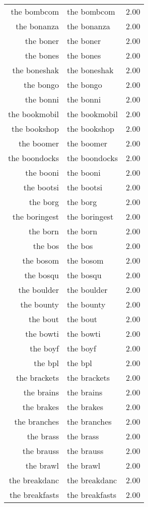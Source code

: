 \begin{table}[ht]
\begin{tabular}{rlr}
  the bombcom & the bombcom & 2.00 \\ 
  the bonanza & the bonanza & 2.00 \\ 
  the boner & the boner & 2.00 \\ 
  the bones & the bones & 2.00 \\ 
  the boneshak & the boneshak & 2.00 \\ 
  the bongo & the bongo & 2.00 \\ 
  the bonni & the bonni & 2.00 \\ 
  the bookmobil & the bookmobil & 2.00 \\ 
  the bookshop & the bookshop & 2.00 \\ 
  the boomer & the boomer & 2.00 \\ 
  the boondocks & the boondocks & 2.00 \\ 
  the booni & the booni & 2.00 \\ 
  the bootsi & the bootsi & 2.00 \\ 
  the borg & the borg & 2.00 \\ 
  the boringest & the boringest & 2.00 \\ 
  the born & the born & 2.00 \\ 
  the bos & the bos & 2.00 \\ 
  the bosom & the bosom & 2.00 \\ 
  the bosqu & the bosqu & 2.00 \\ 
  the boulder & the boulder & 2.00 \\ 
  the bounty & the bounty & 2.00 \\ 
  the bout & the bout & 2.00 \\ 
  the bowti & the bowti & 2.00 \\ 
  the boyf & the boyf & 2.00 \\ 
  the bpl & the bpl & 2.00 \\ 
  the brackets & the brackets & 2.00 \\ 
  the brains & the brains & 2.00 \\ 
  the brakes & the brakes & 2.00 \\ 
  the branches & the branches & 2.00 \\ 
  the brass & the brass & 2.00 \\ 
  the brauss & the brauss & 2.00 \\ 
  the brawl & the brawl & 2.00 \\ 
  the breakdanc & the breakdanc & 2.00 \\ 
  the breakfasts & the breakfasts & 2.00 \\ 

\end{tabular}
\end{table}
